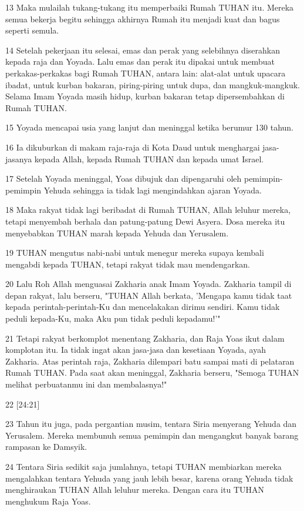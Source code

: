 \par 13 Maka mulailah tukang-tukang itu memperbaiki Rumah TUHAN itu. Mereka semua bekerja begitu sehingga akhirnya Rumah itu menjadi kuat dan bagus seperti semula.
\par 14 Setelah pekerjaan itu selesai, emas dan perak yang selebihnya diserahkan kepada raja dan Yoyada. Lalu emas dan perak itu dipakai untuk membuat perkakas-perkakas bagi Rumah TUHAN, antara lain: alat-alat untuk upacara ibadat, untuk kurban bakaran, piring-piring untuk dupa, dan mangkuk-mangkuk. Selama Imam Yoyada masih hidup, kurban bakaran tetap dipersembahkan di Rumah TUHAN.
\par 15 Yoyada mencapai usia yang lanjut dan meninggal ketika berumur 130 tahun.
\par 16 Ia dikuburkan di makam raja-raja di Kota Daud untuk menghargai jasa-jasanya kepada Allah, kepada Rumah TUHAN dan kepada umat Israel.
\par 17 Setelah Yoyada meninggal, Yoas dibujuk dan dipengaruhi oleh pemimpin-pemimpin Yehuda sehingga ia tidak lagi mengindahkan ajaran Yoyada.
\par 18 Maka rakyat tidak lagi beribadat di Rumah TUHAN, Allah leluhur mereka, tetapi menyembah berhala dan patung-patung Dewi Asyera. Dosa mereka itu menyebabkan TUHAN marah kepada Yehuda dan Yerusalem.
\par 19 TUHAN mengutus nabi-nabi untuk menegur mereka supaya kembali mengabdi kepada TUHAN, tetapi rakyat tidak mau mendengarkan.
\par 20 Lalu Roh Allah menguasai Zakharia anak Imam Yoyada. Zakharia tampil di depan rakyat, lalu berseru, "TUHAN Allah berkata, 'Mengapa kamu tidak taat kepada perintah-perintah-Ku dan mencelakakan dirimu sendiri. Kamu tidak peduli kepada-Ku, maka Aku pun tidak peduli kepadamu!'"
\par 21 Tetapi rakyat berkomplot menentang Zakharia, dan Raja Yoas ikut dalam komplotan itu. Ia tidak ingat akan jasa-jasa dan kesetiaan Yoyada, ayah Zakharia. Atas perintah raja, Zakharia dilempari batu sampai mati di pelataran Rumah TUHAN. Pada saat akan meninggal, Zakharia berseru, "Semoga TUHAN melihat perbuatanmu ini dan membalasnya!"
\par 22 [24:21]
\par 23 Tahun itu juga, pada pergantian musim, tentara Siria menyerang Yehuda dan Yerusalem. Mereka membunuh semua pemimpin dan mengangkut banyak barang rampasan ke Damsyik.
\par 24 Tentara Siria sedikit saja jumlahnya, tetapi TUHAN membiarkan mereka mengalahkan tentara Yehuda yang jauh lebih besar, karena orang Yehuda tidak menghiraukan TUHAN Allah leluhur mereka. Dengan cara itu TUHAN menghukum Raja Yoas.
